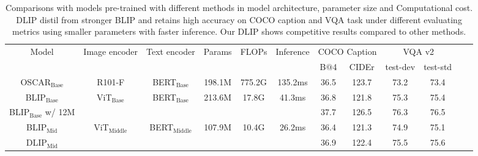 \documentclass[10pt,twocolumn,letterpaper]{article}
\begin{document}
  \begin{table}[h]
    \caption{Comparisons with models pre-trained with different methods in model architecture, parameter size and Computational cost. DLIP distil from stronger BLIP\cite{li2022blip} and retains high accuracy on COCO caption and VQA task under different evaluating metrics using smaller parameters with faster inference. Our DLIP shows competitive results compared to other methods.}
    \label{main_result}
        \begin{small}
    \begin{center}
    \renewcommand\arraystretch{1.2}
    \setlength\tabcolsep{4.5pt}
    \begin{tabular}{c|ccccccccccc}
        \toprule
        \multirow{2}{2.0cm}{\centering Model}  & \multirow{2}{2.0cm}{ \centering Image encoder} & \multirow{2}{1.8cm}{ \centering Text encoder} & \multirow{2}{1.2cm}{\centering Params} & \multirow{2}{1.2cm}{\centering FLOPs} & \multirow{2}{1.2cm}{\centering Inference} & \multicolumn{2}{c}{COCO Caption} & \multicolumn{2}{c}{VQA v2}  \\
        &  &  &  &  & & B$@$4 & CIDEr  &  test-dev & test-std  \\
        \midrule
        OSCAR$_{\text{Base}}$ \cite{li2020oscar}     & R101-F &  BERT$_{\text{Base}}$ & 198.1M & 775.2G & 135.2ms & 36.5 & 123.7 & 73.2 & 73.4 \\
        BLIP$_{\text{Base}}$ \cite{li2022blip}     &  \multirow{2}{1.5cm}{ \centering ViT$_{\text{Base}}$} &  \multirow{2}{1.5cm}{ \centering BERT$_{\text{Base}}$} &  \multirow{2}{1.5cm}{ \centering 213.6M} &  \multirow{2}{1.5cm}{ \centering 17.8G} &  \multirow{2}{1.5cm}{ \centering 41.3ms} & 36.8 & 121.8  & 75.3 & 75.4 \\
        BLIP$_{\text{Base}}$ w/ 12M   & & & &  &  & 37.7 & 126.5  & 76.3 & 76.5 
          \\
        \midrule
        BLIP$_{\text{Mid}}$       & \multirow{3}{1.5cm}{ \centering ViT$_{\text{Middle}}$}  & \multirow{3}{1.5cm}{ \centering BERT$_{\text{Middle}}$}  & \multirow{3}{1.2cm}{ \centering 107.9M} & \multirow{3}{1.0cm}{ \centering 10.4G } & \multirow{3}{1.0cm}{ \centering 26.2ms} & 36.4 & 121.3  & 74.9 & 75.1 \\
        DLIP$_{\text{Mid}}$     &  &  &  &  &  & 36.9 & 122.4  & 75.5 & 75.6 \\

\end{tabular}
\end{center}
\end{small}
\end{table}
\end{document}
